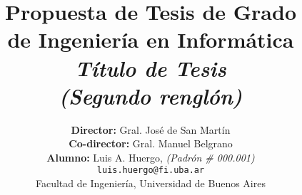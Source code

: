\begin{titlepage}

    \title{     \textbf{Propuesta de Tesis de Grado \\ de Ingeniería en Informática}\\[2.5ex]
        \textit{Título de Tesis \\(Segundo renglón)} }

    \author{
        \textbf{Director:} Gral. José de San Martín \\[2.5ex]
        \textbf{Co-director:} Gral. Manuel Belgrano \\[2.5ex]
        \textbf{Alumno:} Luis A. Huergo, \textit{(Padrón \# 000.001)}                                \\
        \texttt{ luis.huergo@fi.uba.ar }                                    \\[2.5ex]
        \normalsize{Facultad de Ingeniería, Universidad de Buenos Aires}        \\
    }
    \date{}

\end{titlepage}

\maketitle
\thispagestyle{empty}